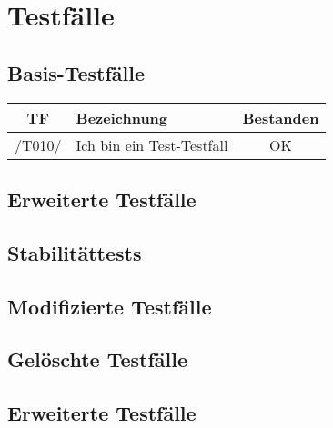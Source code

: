 \section{Testfälle}
\subsection{Basis-Testfälle}
\begin{center}
    \begin{tabular}[h]{|c|l|c|}
        \hline
        \textbf{TF} & \textbf{Bezeichnung} & \textbf{Bestanden} \\
        \hline
        /T010/ & Ich bin ein Test-Testfall & \cellcolor{green!25}OK \\
        \hline
    \end{tabular}
\end{center}

\subsection{Erweiterte Testfälle}
\subsection{Stabilitättests}

\subsection{Modifizierte Testfälle}

\subsection{Gelöschte Testfälle}

\subsection{Erweiterte Testfälle}




